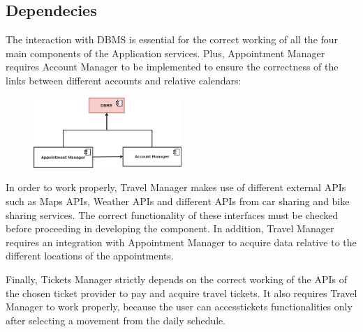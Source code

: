 \subsection{Dependecies}
The interaction with DBMS is essential for the correct working of all the four main components of the Application services. Plus, Appointment Manager requires Account Manager to be implemented to ensure the correctness of the links between different accounts and relative calendars:

\begin{figure}[H]
	\centering
	\includegraphics[width=0.5\textwidth]{Images/Test/1.png}%
\end{figure}

In order to work properly, Travel Manager makes use of different external APIs such as Maps APIs, Weather APIs and different APIs from car sharing and bike sharing services. The correct functionality of these interfaces must be checked before proceeding in developing the component. In addition, Travel Manager requires an integration with Appointment Manager to acquire data relative to the different locations of the appointments.

\begin{figure}[!h]
	\centering
\end{figure}

Finally, Tickets Manager strictly depends on the correct working of the APIs of the chosen ticket provider to pay and acquire travel tickets. It also requires Travel Manager to work properly, because the user can accesstickets functionalities only after selecting a movement from the daily schedule. 

\begin{figure}[!h]
	\centering
\end{figure}


